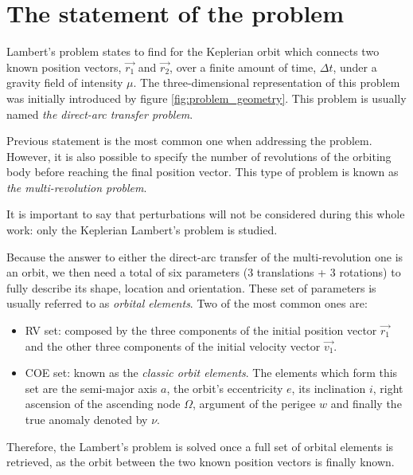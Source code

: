 \section{The statement of the problem}

Lambert's problem states to find for the Keplerian orbit which connects two
known position vectors, $\vec{r_{1}}$ and $\vec{r_{2}}$, over a finite amount of
time, $\Delta t$, under a gravity field of intensity $\mu$. The
three-dimensional representation of this problem was initially introduced by
figure \ref{fig:problem_geometry}. This problem is usually named \textit{the
  direct-arc transfer problem}.

Previous statement is the most common one when addressing the problem. However,
it is also possible to specify the number of revolutions of the orbiting body
before reaching the final position vector. This type of problem is known as
\textit{the multi-revolution problem}.

It is important to say that perturbations will not be considered during this
whole work: only the Keplerian Lambert's problem is studied.

Because the answer to either the direct-arc transfer of the multi-revolution one
is an orbit, we then need a total of six parameters (3 translations + 3
rotations) to fully describe its shape, location and orientation. These set of
parameters is usually referred to as \textit{orbital elements}. Two of the most
common ones are:

\begin{itemize}
  \item RV set: composed by the three components of the initial position
        vector $\vec{r_{1}}$ and the other three components of the
        initial velocity vector $\vec{v_{1}}$.
  \item COE set: known as the \textit{classic orbit elements}. The
        elements which form this set are the semi-major axis $a$, the
        orbit's eccentricity $e$, its inclination $i$, right ascension
        of the ascending node $\Omega$, argument of the perigee $w$ and
        finally the true anomaly denoted by $\nu$.
\end{itemize}

Therefore, the Lambert's problem is solved once a full set of orbital elements
is retrieved, as the orbit between the two known position vectors is finally
known.

